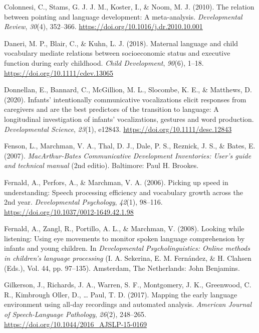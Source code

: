 \documentclass[
  man,mask,floatsintext]{apa6}
\newlength{\cslhangindent}
\newlength{\cslentryspacingunit} %
\newenvironment{CSLReferences}[2] %
 {%
  \setlength{\parindent}{0pt}
  \ifodd #1
  \let\oldpar\par
  \def\par{\hangindent=\cslhangindent\oldpar}
  \fi
  \setlength{\parskip}{#2\cslentryspacingunit}
 }%
 {}
\begin{document}
\begin{CSLReferences}{1}{0}
\leavevmode{}%
Colonnesi, C., Stams, G. J. J. M., Koster, I., \& Noom, M. J. (2010). The relation between pointing and language development: {A} meta-analysis. \emph{Developmental Review}, \emph{30}(4), 352--366. \url{https://doi.org/10.1016/j.dr.2010.10.001}

\leavevmode{}%
Daneri, M. P., Blair, C., \& Kuhn, L. J. (2018). Maternal language and child vocabulary mediate relations between socioeconomic status and executive function during early childhood. \emph{Child Development}, \emph{90}(6), 1--18. \url{https://doi.org/10.1111/cdev.13065}

\leavevmode{}%
Donnellan, E., Bannard, C., McGillion, M. L., Slocombe, K. E., \& Matthews, D. (2020). Infants' intentionally communicative vocalizations elicit responses from caregivers and are the best predictors of the transition to language: {A} longitudinal investigation of infants' vocalizations, gestures and word production. \emph{Developmental Science}, \emph{23}(1), e12843. \url{https://doi.org/10.1111/desc.12843}

\leavevmode{}%
Fenson, L., Marchman, V. A., Thal, D. J., Dale, P. S., Reznick, J. S., \& Bates, E. (2007). \emph{{MacArthur}-{Bates} {Communicative} {Development} {Inventories}: {User}'s guide and technical manual} (2nd editio). Baltimore: Paul H. Brookes.

\leavevmode{}%
Fernald, A., Perfors, A., \& Marchman, V. A. (2006). Picking up speed in understanding: {Speech} processing efficiency and vocabulary growth across the 2nd year. \emph{Developmental Psychology}, \emph{42}(1), 98--116. \url{https://doi.org/10.1037/0012-1649.42.1.98}

\leavevmode{}%
Fernald, A., Zangl, R., Portillo, A. L., \& Marchman, V. (2008). Looking while listening: {Using} eye movements to monitor spoken language comprehension by infants and young children. In \emph{Developmental {Psycholinguistics}: {Online} methods in children's language processing} (I. A. Sekerina, E. M. Fernández, \& H. Clahsen (Eds.), Vol. 44, pp. 97--135). Amsterdam, The Netherlands: John Benjamins.

\leavevmode{}%
Gilkerson, J., Richards, J. A., Warren, S. F., Montgomery, J. K., Greenwood, C. R., Kimbrough Oller, D., \ldots{} Paul, T. D. (2017). Mapping the early language environment using all-day recordings and automated analysis. \emph{American Journal of Speech-Language Pathology}, \emph{26}(2), 248--265. \url{https://doi.org/10.1044/2016_AJSLP-15-0169}


\end{CSLReferences}
\end{document}
